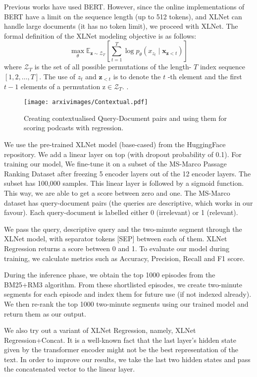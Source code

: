 \documentclass[10pt,twocolumn]{article}
\begin{document}
Previous works have used BERT. However, since the online implementations of BERT have a limit on the sequence length (up to 512 tokens), and XLNet can handle large documents (it has no token limit), we proceed with XLNet.
The formal definition of the XLNet modeling objective is as follows:
\begin{equation}
\max _{\theta} \mathbb{E}_{\mathbf{z} \sim \mathcal{Z}_{T}}\left[\sum_{t=1}^{T} \log p_{\theta}\left(x_{z_{t}} \mid \mathbf{x}_{\mathbf{z}<t}\right)\right]
\end{equation}
where $\mathcal{Z}_{T}$ is the set of all possible permutations of the length- $T$ index sequence $[1,2, \ldots, T]$. The use of $z_{t}$ and $\mathbf{z}_{<t}$ is to denote the $t$ -th element and the first $t-1$ elements of a permutation $\mathrm{z} \in \mathcal{Z}_{T} .$ \cite{XLNet}.
\begin{figure*}
    \texttt{[image: arxivimages/Contextual.pdf]}
    \caption{Creating contextualised Query-Document pairs and using them for scoring podcasts with regression.}
\end{figure*}
We use the pre-trained XLNet model (base-cased) from the HuggingFace repository. We add a linear layer on top (with dropout probability of 0.1). For training our model, We fine-tune it on a subset of the MS-Marco Passage Ranking Dataset \cite{msmarco} after freezing 5 encoder layers out of the 12 encoder layers. The subset has 100,000 samples. This linear layer is followed by a sigmoid function. This way, we are able to get a score between zero and one. The MS-Marco dataset has query-document pairs (the queries are descriptive, which works in our favour). Each query-document is labelled either 0 (irrelevant) or 1 (relevant).

We pass the query, descriptive query and the two-minute segment through the XLNet model, with separator tokens [SEP] between each of them. XLNet Regression returns a score between 0 and 1. To evaluate our model during training, we calculate metrics such as Accuracy, Precision, Recall and F1 score.



During the inference phase, we obtain the top 1000 episodes from the BM25+RM3 algorithm. From these shortlisted episodes, we create two-minute segments for each episode and index them for future use (if not indexed already).
We then re-rank the top 1000 two-minute segments using our trained model and return them as our output.

We also try out a variant of XLNet Regression, namely, XLNet Regression+Concat. It is a well-known fact that the last layer's hidden state given by the transformer encoder might not be the best representation of the text. In order to improve our results, we take the last two hidden states and pass the concatenated vector to the linear layer.
\end{document}
